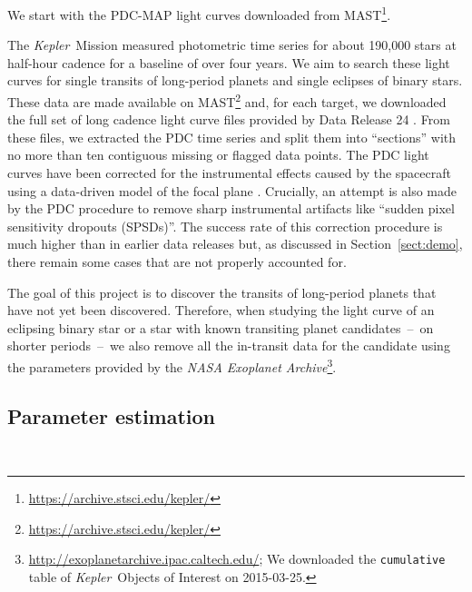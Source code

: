 \documentclass[manuscript, letterpaper]{aastex6}
\newcommand{\project}[1]{\textsl{#1}}
\newcommand{\kepler}{\project{Kepler}}
\newcommand{\dfmfiglabel}[1]{\label{fig:#1}}
\newcommand{\sectionname}{Section}
\newcommand{\sectref}[1]{\ref{sect:#1}}
\newcommand{\Sect}[1]{\sectionname~\sectref{#1}}
\newcommand{\sect}[1]{\Sect{#1}}
\begin{document}
We start with the PDC-MAP light curves downloaded from
MAST\footnote{\url{https://archive.stsci.edu/kepler/}}.



The \kepler\ Mission measured photometric time series for about 190,000 stars
at half-hour cadence for a baseline of over four years.
We aim to search these light curves for single transits of long-period planets
and single eclipses of binary stars.
These data are made available on
MAST\footnote{\url{https://archive.stsci.edu/kepler/}} and, for each target,
we downloaded the full set of long cadence light curve files provided by Data
Release 24 \citep{Thompson:2015}.
From these files, we extracted the PDC time series and split them into
``sections'' with no more than ten contiguous missing or flagged data points.
The PDC light curves have been corrected for the instrumental effects caused
by the spacecraft using a data-driven model of the focal plane
\citep{Stumpe:2012, Smith:2012}.
Crucially, an attempt is also made by the PDC procedure to remove sharp
instrumental artifacts like ``sudden pixel sensitivity dropouts (SPSDs)''.
The success rate of this correction procedure is much higher than in earlier
data releases but, as discussed in \sect{demo}, there remain some cases that
are not properly accounted for.

The goal of this project is to discover the transits of long-period planets
that have not yet been discovered.
Therefore, when studying the light curve of an eclipsing binary star or a star
with known transiting planet candidates~--~on shorter periods~--~we also remove
all the in-transit data for the candidate using the parameters provided by the
\project{NASA Exoplanet
Archive}\footnote{\url{http://exoplanetarchive.ipac.caltech.edu/}; We
downloaded the \texttt{cumulative} table of \kepler\ Objects of Interest on
2015-03-25.}.


\subsection{Parameter estimation}

\begin{figure}[p]~\\
\begin{center}

\end{center}
\caption{%
\dfmfiglabel{lightcurves}}
\end{figure}
\end{document}
